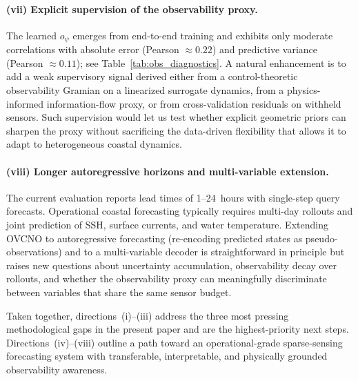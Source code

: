 \documentclass[11pt,a4paper]{article}
\begin{document}
\paragraph{(vii) Explicit supervision of the observability proxy.}
The learned $o_\psi$ emerges from end-to-end training and exhibits only moderate correlations with absolute error (Pearson $\approx 0.22$) and predictive variance (Pearson $\approx 0.11$); see Table~\ref{tab:obs_diagnostics}. A natural enhancement is to add a weak supervisory signal derived either from a control-theoretic observability Gramian on a linearized surrogate dynamics, from a physics-informed information-flow proxy, or from cross-validation residuals on withheld sensors. Such supervision would let us test whether explicit geometric priors can sharpen the proxy without sacrificing the data-driven flexibility that allows it to adapt to heterogeneous coastal dynamics.

\paragraph{(viii) Longer autoregressive horizons and multi-variable extension.}
The current evaluation reports lead times of 1--24~hours with single-step query forecasts. Operational coastal forecasting typically requires multi-day rollouts and joint prediction of SSH, surface currents, and water temperature. Extending OVCNO to autoregressive forecasting (re-encoding predicted states as pseudo-observations) and to a multi-variable decoder is straightforward in principle but raises new questions about uncertainty accumulation, observability decay over rollouts, and whether the observability proxy can meaningfully discriminate between variables that share the same sensor budget.

Taken together, directions~(i)--(iii) address the three most pressing methodological gaps in the present paper and are the highest-priority next steps. Directions~(iv)--(viii) outline a path toward an operational-grade sparse-sensing forecasting system with transferable, interpretable, and physically grounded observability awareness.
\end{document}

